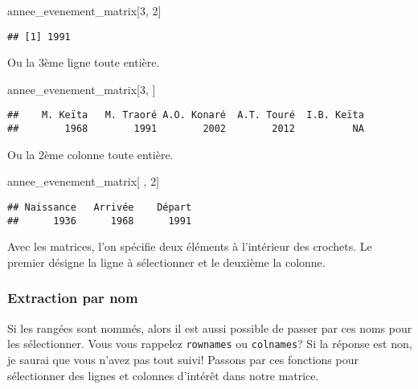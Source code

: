 \documentclass[]{book}
\newenvironment{Shaded}{\begin{snugshade}}{\end{snugshade}}
\newcommand{\DecValTok}[1]{\textcolor[rgb]{0.00,0.00,0.81}{#1}}
\newcommand{\NormalTok}[1]{#1}
\begin{document}
\begin{Shaded}
\begin{Highlighting}[]
\NormalTok{annee_evenement_matrix[}\DecValTok{3}\NormalTok{, }\DecValTok{2}\NormalTok{]}
\end{Highlighting}
\end{Shaded}

\begin{verbatim}
## [1] 1991
\end{verbatim}

Ou la 3ème ligne toute entière.

\begin{Shaded}
\begin{Highlighting}[]
\NormalTok{annee_evenement_matrix[}\DecValTok{3}\NormalTok{, ]}
\end{Highlighting}
\end{Shaded}

\begin{verbatim}
##    M. Keïta   M. Traoré A.O. Konaré  A.T. Touré  I.B. Keïta 
##        1968        1991        2002        2012          NA
\end{verbatim}

Ou la 2ème colonne toute entière.

\begin{Shaded}
\begin{Highlighting}[]
\NormalTok{annee_evenement_matrix[ , }\DecValTok{2}\NormalTok{]}
\end{Highlighting}
\end{Shaded}

\begin{verbatim}
## Naissance   Arrivée    Départ 
##      1936      1968      1991
\end{verbatim}

Avec les matrices, l'on spécifie deux éléments à l'intérieur des
crochets. Le premier désigne la ligne à sélectionner et le deuxième la
colonne.

\subsubsection{Extraction par nom}\label{extraction-par-nom}

Si les rangées sont nommés, alors il est aussi possible de passer par
ces noms pour les sélectionner. Vous vous rappelez \texttt{rownames} ou
\texttt{colnames}? Si la réponse est non, je saurai que vous n'avez pas
tout suivi! Passons par ces fonctions pour sélectionner des lignes et
colonnes d'intérêt dans notre matrice.
\end{document}
